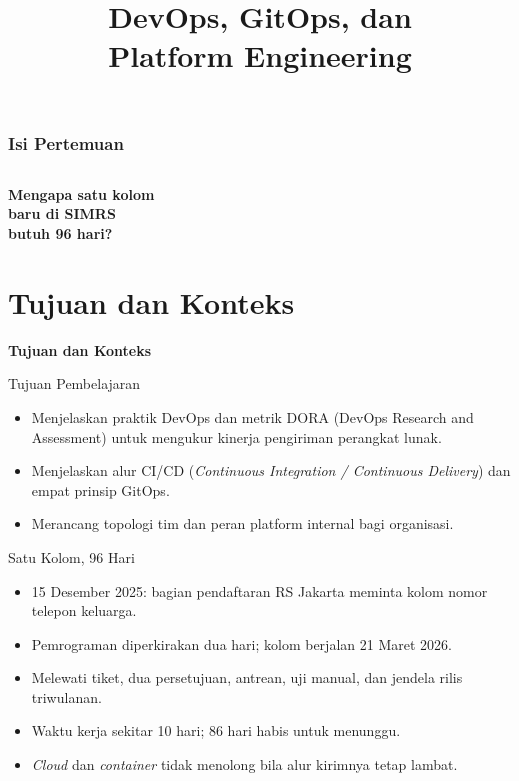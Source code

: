 \documentclass[aspectratio=169, table, 12pt]{beamer}
\title{\Huge DevOps, GitOps, dan\\ \vspace{10pt} Platform Engineering}
\begin{document}
\frame{\titlepage}

\begin{frame}
  \frametitle{Isi Pertemuan}
  \vspace{14pt}
  \begin{columns}[t]
    {\small\tableofcontents[sections={1-4}]}

    {\small\tableofcontents[sections={5-8}]}
  \end{columns}
\end{frame}

\begin{frame}{\hfill}
  \centering
  \Huge{\textbf{Mengapa satu kolom\\baru di SIMRS\\butuh 96 hari?}}
\end{frame}

\section{Tujuan dan Konteks}

\begin{frame}{\hfill}
  \centering
  \Huge{\textbf{Tujuan dan Konteks}}
\end{frame}

\begin{frame}{{\Large Tujuan Pembelajaran}}
  \vspace{10pt}
  \begin{itemize}
    \item Menjelaskan praktik DevOps dan metrik DORA (DevOps Research and Assessment) untuk
          mengukur kinerja pengiriman perangkat lunak.
    \item Menjelaskan alur CI/CD (\textit{Continuous Integration / Continuous Delivery}) dan
          empat prinsip GitOps.
    \item Merancang topologi tim dan peran platform internal bagi organisasi.
  \end{itemize}
\end{frame}

\begin{frame}{{\Large Satu Kolom, 96 Hari}}
  \vspace{10pt}
  \begin{itemize}
    \item 15 Desember 2025: bagian pendaftaran RS Jakarta meminta kolom nomor telepon keluarga.
    \item Pemrograman diperkirakan dua hari; kolom berjalan 21 Maret 2026.
    \item Melewati tiket, dua persetujuan, antrean, uji manual, dan jendela rilis triwulanan.
    \item Waktu kerja sekitar 10 hari; 86 hari habis untuk menunggu.
    \item \textit{Cloud} dan \textit{container} tidak menolong bila alur kirimnya tetap lambat.
  \end{itemize}
\end{frame}
\end{document}
